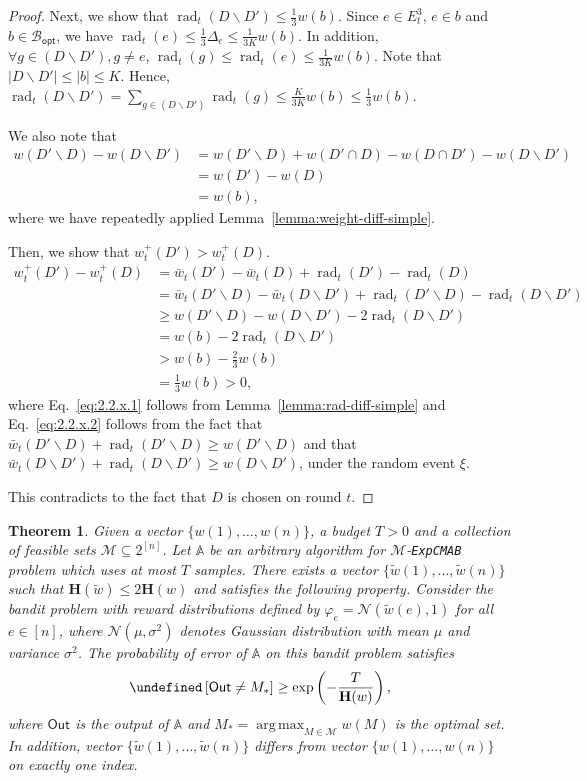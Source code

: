 \documentclass{article}
\newtheorem{theorem}{Theorem}
\newcommand{\Problem}{\texttt{ExpCMAB}\xspace}
\newcommand{\Rew}{\varphi}
\newcommand{\M}{\mathcal M}
\newcommand{\del}{\backslash}
\newcommand{\Bopt}{\mathcal B_{\mathsf{opt}}}
\DeclareMathOperator{\rad}{rad}
\DeclareMathOperator*{\argmax}{arg\,max}
\newcommand{\out}{\mathsf{Out}}
\let\Pr\undefined
\DeclareMathOperator{\Pr}{Pr}
\begin{document}
\begin{spacing}{1.1}
\begin{proof}
Next, we show that $\rad_t(D \del D') \le \frac13 w(b)$.
Since $e\in E_t^3$, $e\in b$ and $b\in \Bopt$, we have $\rad_t(e) \le \frac{1}{3}\Delta_e \le \frac{1}{3K}w(b)$.
In addition, $\forall g\in (D \del D'), g\not=e$, $\rad_t(g) \le \rad_t(e)\le \frac{1}{3K}w(b)$.
Note that $|D\del D'| \le |b| \le K$.
Hence, $\rad_t(D\del D') = \sum_{g\in (D\del D')} \rad_t(g) \le \frac{K}{3K}w(b) \le \frac{1}{3}w(b)$.

We also note that
\begin{align}
w(D'\del D)-w(D\del D') &= w(D' \del D)+w(D'\cap D)-w(D\cap D')-w(D\del D')\\
						&= w(D')-w(D) \\
						&= w(b),
\end{align}
where we have repeatedly applied Lemma~\ref{lemma:weight-diff-simple}.

Then, we show that $w^+_t(D') > w^+_t(D)$.
\begin{align}
	w_t^+(D')-w_t^+(D) &= \bar w_t(D')-\bar w_t(D)+\rad_t(D')-\rad_t(D)\\
					   &= \bar w_t(D'\del D)-\bar w_t(D\del D')+\rad_t(D'\del D)-\rad_t(D\del D') \label{eq:2.2.x.1} \\
					   &\ge w(D'\del D)-w(D\del D')-2\rad_t(D\del D') \label{eq:2.2.x.2} \\
					   &= w(b)-2\rad_t(D\del D')\\
					   &> w(b)-\frac23 w(b) \\
					   &= \frac13 w(b) > 0,
\end{align}
where Eq.~\eqref{eq:2.2.x.1} follows from Lemma~\ref{lemma:rad-diff-simple} and Eq.~\eqref{eq:2.2.x.2} follows from
the fact that $\bar w_t(D'\del D)+\rad_t(D'\del D)\ge w(D'\del D)$ and that $\bar w_t(D\del D')+\rad_t(D\del D')\ge w(D\del D')$, under the random event $\xi$.

This contradicts to the fact that $D$ is chosen on round $t$.
\end{proof}

\begin{theorem}
Given a vector $\{w(1),\ldots, w(n)\}$, a budget $T>0$ and a collection of feasible sets $\M \subseteq 2^{[n]}$.
Let $\mathbb A$ be an arbitrary algorithm for $\M$-\Problem problem which uses at most $T$ samples.
There exists a vector $\{\tilde w(1), \ldots, \tilde w(n)\}$ such that $\mathbf H(\tilde w) \le 2\mathbf H(w)$ and satisfies the following property.
Consider the bandit problem with reward distributions  defined by $\Rew_e = \mathcal N(\tilde w(e), 1)$ for all $e\in[n]$, where $\mathcal N(\mu,\sigma^2)$ denotes Gaussian distribution with mean $\mu$ and variance $\sigma^2$.
The probability of error of $\mathbb A$ on this bandit problem satisfies
$$
\Pr\left[\out\not=M_* \right] \ge \exp\left(-\frac{T}{\mathbf H(w)}\right),
$$
where $\out$ is the output of $\mathbb A$ and $M_*=\argmax_{M\in \M} w(M)$ is the optimal set. 
In addition, vector $\{\tilde w(1),\ldots, \tilde w(n)\}$ differs from vector $\{w(1),\ldots,w(n)\}$ on exactly one index.
\end{theorem}


\end{spacing}
\end{document}
